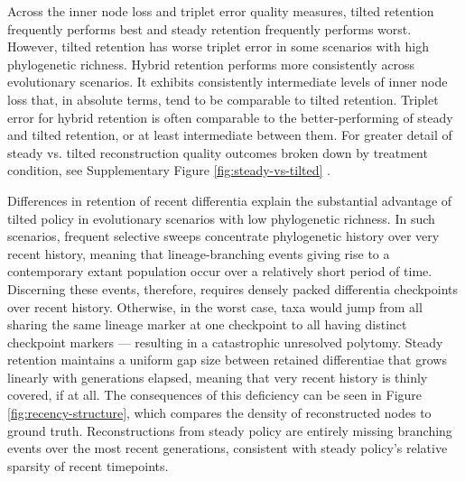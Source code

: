 Across the inner node loss and triplet error quality measures, tilted retention frequently performs best and steady retention frequently performs worst.
However, tilted retention has worse triplet error in some scenarios with high phylogenetic richness.
Hybrid retention performs more consistently across evolutionary scenarios.
It exhibits consistently intermediate levels of inner node loss that, in absolute terms, tend to be comparable to tilted retention.
Triplet error for hybrid retention is often comparable to the better-performing of steady and tilted retention, or at least intermediate between them.
For greater detail of steady vs. tilted reconstruction quality outcomes broken down by treatment condition, see Supplementary Figure \ref{fig:steady-vs-tilted} \citep{moreno2024supplemental}.



Differences in retention of recent differentia explain the substantial advantage of tilted policy in evolutionary scenarios with low phylogenetic richness.
In such scenarios, frequent selective sweeps concentrate phylogenetic history over very recent history, meaning that lineage-branching events giving rise to a contemporary extant population occur over a relatively short period of time.
Discerning these events, therefore, requires densely packed differentia checkpoints over recent history.
Otherwise, in the worst case, taxa would jump from all sharing the same lineage marker at one checkpoint to all having distinct checkpoint markers --- resulting in a catastrophic unresolved polytomy.
Steady retention maintains a uniform gap size between retained differentiae that grows linearly with generations elapsed, meaning that very recent history is thinly covered, if at all.
The consequences of this deficiency can be seen in Figure \ref{fig:recency-structure}, which compares the density of reconstructed nodes to ground truth.
Reconstructions from steady policy are entirely missing branching events over the most recent generations, consistent with steady policy's relative sparsity of recent timepoints.

